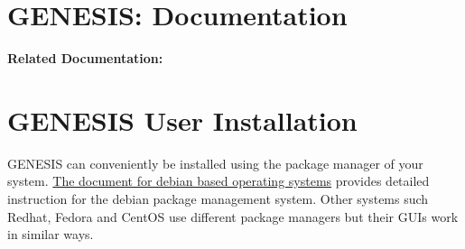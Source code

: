 \documentclass[12pt]{article}
\begin{document}
\section*{GENESIS: Documentation}

{\bf Related Documentation:}

\section*{GENESIS User Installation}

GENESIS can conveniently be installed using the package manager of
your system.
\href{../installation-debian/installation-debian.tex}{The document for
  debian based operating systems} provides detailed instruction for
the debian package management system.  Other systems such Redhat,
Fedora and CentOS use different package managers but their GUIs work
in similar ways.






\end{document}
